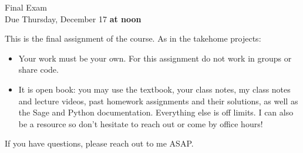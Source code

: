 \documentclass[11pt]{article}
\begin{document}
\begin{center}
\Large {Final Exam}\\
\small {Due Thursday, December 17 \textbf{at noon}}
\end{center}
This is the final assignment of the course.  As in the takehome projects:
\begin{itemize}
  \item{Your work must be your own.  For this assignment do not work in groups or share code.}
  \item{It is open book: you may use the textbook, your class notes, my class notes and lecture videos, past homework assignments and their solutions, as well as the Sage and Python documentation.  Everything else is off limits.  I can also be a resource so don't hesitate to reach out or come by office hours!}
\end{itemize}
If you have questions, please reach out to me ASAP.
\end{document}
